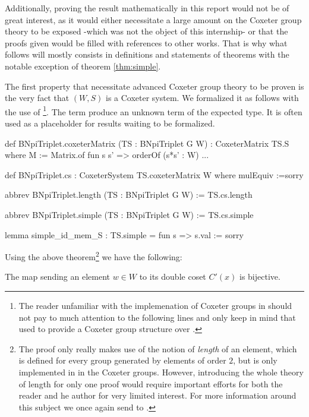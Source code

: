  Additionally, proving the result mathematically in this report would not be of great interest, as it would either necessitate a large amount on the Coxeter group theory to be exposed -which was not the object of this internship- or that the proofs given would be filled with references to other works. That is why what follows will mostly consists in definitions and statements of theorems with the notable exception of theorem \ref{thm:simple}.

The first property that necessitate advanced Coxeter group theory to be proven is the very fact that $\left( W,S \right)$ is a Coxeter system. We formalized it as follows with the use of  \footnote{The reader unfamiliar with the implemenation of Coxeter groups in \Lean should not pay to much attention to the following lines and only keep in mind that used  to provide a Coxeter group structure over .}. The term  produce an unknown term of the expected type. It is often used as a placeholder for results waiting to be formalized.

\begin{leancode}
def BNpiTriplet.coxeterMatrix  (TS : BNpiTriplet G W) : CoxeterMatrix TS.S where
  M := Matrix.of fun s s' => orderOf (s*s' : W)
  ...

def  BNpiTriplet.cs : CoxeterSystem TS.coxeterMatrix W where
  mulEquiv :=sorry

abbrev BNpiTriplet.length (TS : BNpiTriplet G W) := TS.cs.length

abbrev BNpiTriplet.simple (TS : BNpiTriplet G W) := TS.cs.simple

lemma simple_id_mem_S : TS.simple = fun s => s.val := sorry
\end{leancode}

Using the above theorem\footnote{The proof only really makes use of the notion of \emph{length} of an element, which is defined for every group generated by elements of order $2$, but is only implemented in \Lean in the Coxeter groups. However, introducing the whole theory of length for only one proof would require  important efforts for both the reader and he author for very limited interest. For more information around this subject we once again send to \cite{bourbaki_groupes_2007}.} we have the following: 

\begin{lemme}
    The map sending an element $w \in W$ to its double coset $C'\left( x \right)$ is bijective.
\end{lemme}

